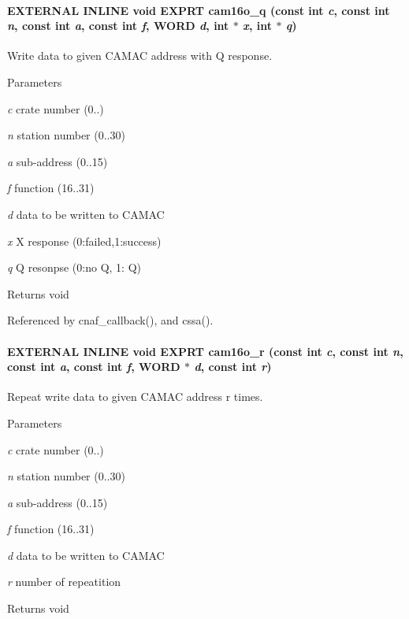 \paragraph[{cam16o\_\-q}]{\setlength{\rightskip}{0pt plus 5cm}EXTERNAL INLINE void EXPRT cam16o\_\-q (const int {\em c}, \/  const int {\em n}, \/  const int {\em a}, \/  const int {\em f}, \/  {\bf WORD} {\em d}, \/  int $\ast$ {\em x}, \/  int $\ast$ {\em q})}\hfill\label{group__mcstdfunctionh_ga971dc315017a5801f0131c4c2d396d28}
Write data to given CAMAC address with Q response. 
\begin{DoxyParams}{Parameters}
\item[{\em c}]crate number (0..) \item[{\em n}]station number (0..30) \item[{\em a}]sub-\/address (0..15) \item[{\em f}]function (16..31) \item[{\em d}]data to be written to CAMAC \item[{\em x}]X response (0:failed,1:success) \item[{\em q}]Q resonpse (0:no Q, 1: Q) \end{DoxyParams}
\begin{DoxyReturn}{Returns}
void 
\end{DoxyReturn}


Referenced by cnaf\_\-callback(), and cssa().
\paragraph[{cam16o\_\-r}]{\setlength{\rightskip}{0pt plus 5cm}EXTERNAL INLINE void EXPRT cam16o\_\-r (const int {\em c}, \/  const int {\em n}, \/  const int {\em a}, \/  const int {\em f}, \/  {\bf WORD} $\ast$ {\em d}, \/  const int {\em r})}\hfill\label{group__mcstdfunctionh_ga775c859ad1eb0a301d8716b369d43400}
Repeat write data to given CAMAC address r times. 
\begin{DoxyParams}{Parameters}
\item[{\em c}]crate number (0..) \item[{\em n}]station number (0..30) \item[{\em a}]sub-\/address (0..15) \item[{\em f}]function (16..31) \item[{\em d}]data to be written to CAMAC \item[{\em r}]number of repeatition \end{DoxyParams}
\begin{DoxyReturn}{Returns}
void 
\end{DoxyReturn}
